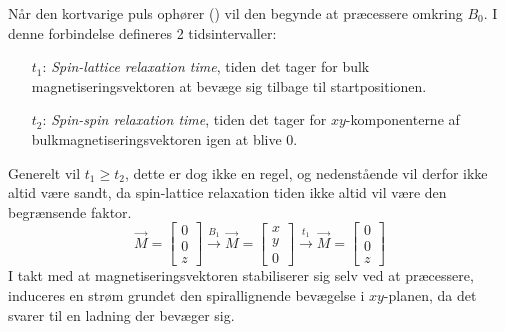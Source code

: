     Når den kortvarige puls ophører () vil den begynde at præcessere omkring $B_0$. I denne forbindelse defineres 2 tidsintervaller:
    \begin{itemize}
        \item[$t_1$:] \textit{Spin-lattice relaxation time}, tiden det tager for bulk magnetiseringsvektoren at bevæge sig tilbage til startpositionen.
        \item[$t_2$:] \textit{Spin-spin relaxation time}, tiden det tager for $xy$-komponenterne af bulkmagnetiseringsvektoren igen at blive 0. 
    \end{itemize}
    Generelt vil $t_1 \geq t_2$, dette er dog ikke en regel, og nedenstående vil derfor ikke altid være sandt, da spin-lattice relaxation tiden ikke altid vil være den begrænsende faktor.
    \[
        \overrightarrow{M}=
        \begin{bmatrix}
            0 \\
            0 \\
            z
        \end{bmatrix}
        \stackrel{B_1}{\longrightarrow}
        \overrightarrow{M}=
        \begin{bmatrix}
            x \\
            y \\
            0
        \end{bmatrix}
        \stackrel{t_1}{\longrightarrow}
        \overrightarrow{M}=
        \begin{bmatrix}
            0 \\
            0 \\
            z
        \end{bmatrix}
    \]
    I takt med at magnetiseringsvektoren stabiliserer sig selv ved at præcessere, induceres en strøm grundet den spirallignende bevægelse i $xy$-planen, da det svarer til en ladning der bevæger sig.     
